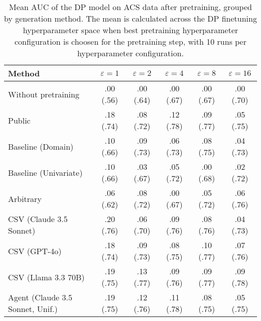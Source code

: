 \begin{table}[h!]
    \centering
    \caption{Mean AUC of the DP model on ACS data after pretraining, grouped by generation method. The mean is calculated across the DP finetuning hyperparameter space when best pretraining hyperparameter configuration is choosen for the pretraining step, with 10 runs per hyperparameter configuration.}
    \label{tab:epsilon_comparison}
    \begin{tabular}{lccccc}
    \toprule
    Method & $\varepsilon=1$ & $\varepsilon=2$ & $\varepsilon=4$ & $\varepsilon=8$ & $\varepsilon=16$ \\
    \midrule
    Without pretraining & .00 {\small (.56)} & .00 {\small (.64)} & .00 {\small (.67)} & .00 {\small (.67)} & .00 {\small (.70)} \\
    \arrayrulecolor{black!50!}\midrule
    Public & .18 {\small (.74)} & .08 {\small (.72)} & \cellcolor{gold!30}.12 {\small (.78)} & \cellcolor{bronze!30}.09 {\small (.77)} & .05 {\small (.75)} \\
    \arrayrulecolor{black!50!}\midrule
    Baseline (Domain) & .10 {\small (.66)} & .09 {\small (.73)} & .06 {\small (.73)} & .08 {\small (.75)} & .04 {\small (.73)} \\
    Baseline (Univariate) & .10 {\small (.66)} & .03 {\small (.67)} & .05 {\small (.72)} & .00 {\small (.68)} & .02 {\small (.72)} \\
    \arrayrulecolor{black!50!}\midrule
    Arbitrary & .06 {\small (.62)} & .08 {\small (.72)} & .00 {\small (.67)} & .05 {\small (.72)} & \cellcolor{bronze!30}.06 {\small (.76)} \\
    \arrayrulecolor{black!50!}\midrule
    CSV (Claude 3.5 Sonnet) & \cellcolor{silver!30}.20 {\small (.76)} & .06 {\small (.70)} & .09 {\small (.76)} & .08 {\small (.76)} & .04 {\small (.73)} \\
    CSV (GPT-4o) & .18 {\small (.74)} & .09 {\small (.73)} & .08 {\small (.75)} & \cellcolor{silver!30}.10 {\small (.77)} & \cellcolor{silver!30}.07 {\small (.76)} \\
    CSV (Llama 3.3 70B) & \cellcolor{bronze!30}.19 {\small (.75)} & \cellcolor{gold!30}.13 {\small (.77)} & \cellcolor{bronze!30}.09 {\small (.76)} & \cellcolor{bronze!30}.09 {\small (.77)} & \cellcolor{gold!30}.09 {\small (.78)} \\
    \arrayrulecolor{black!50!}\midrule
    Agent (Claude 3.5 Sonnet, Unif.) & \cellcolor{bronze!30}.19 {\small (.75)} & \cellcolor{silver!30}.12 {\small (.76)} & \cellcolor{silver!30}.11 {\small (.78)} & .08 {\small (.75)} & .05 {\small (.75)} \\

\end{tabular}
\end{table}
